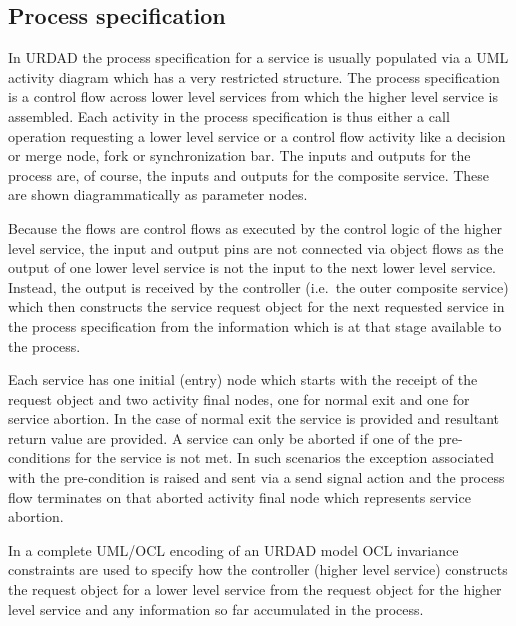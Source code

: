 
\subsection{Process specification}

In URDAD the process specification for a service is usually populated via a UML activity diagram 
which has a very restricted structure. The process specification is a control flow across lower level
services from which the higher level service is assembled. Each activity in the process specification
is thus either a call operation requesting a lower level service or a control flow activity like a decision 
or merge node, fork or synchronization bar. The inputs and outputs for the process are, of course,
the inputs and outputs for the composite service. These are shown diagrammatically as parameter
nodes.

Because the flows are control flows as executed by the control logic of the higher level service,
the input and output pins are not connected via object flows as the output of one lower level service
is not the input to the next lower level service. Instead, the output is received by the controller 
(i.e.\ the outer composite service) which then constructs the service request object for the next requested
service in the process specification from the information which is at that stage available to the process.

Each service has one initial (entry) node which starts with the receipt of the request object and two 
activity final nodes, one for normal exit and one for service abortion. 
In the case of normal exit the service is provided and resultant return value are provided. 
A service can only be aborted if one of the pre-conditions for the service is not met. In such scenarios
the exception associated with the pre-condition is raised and sent via a send signal action and
the process flow terminates on that aborted activity final node which represents service abortion.

In a complete UML/OCL encoding of an URDAD model OCL invariance constraints are used to specify how the
controller (higher level service) constructs the request object for a lower level service from the request object for
the higher level service and any information so far accumulated in the process.
